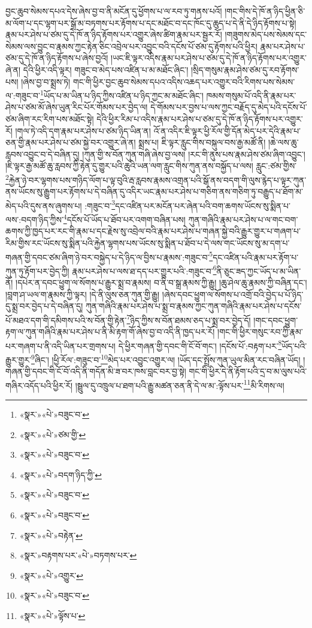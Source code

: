 བྱང་ཆུབ་སེམས་དཔའ་དེས་ཞེས་བྱ་བ་ནི་མངོན་དུ་ཕྱོགས་པ་ལ་རབ་ཏུ་གནས་པའོ། །གང་གིས་དེ་ཁོ་ན་ཉིད་ཕྱིན་ཅི་མ་ལོག་པ་དང་ལྷག་པར་སྒྲོ་མ་བཏགས་པར་རྟོགས་པ་དང་མཐོང་བ་དང་ཁོང་དུ་ཆུད་པ་དེ་ནི་དེ་ཉིད་རྟོགས་པ་སྟེ། རྣམ་པར་ཤེས་པ་ཙམ་དུ་དེ་ཁོ་ན་ཉིད་རྟོགས་པར་འགྱུར་ཞེས་ཚིག་རྣམ་པར་སྦྱར་རོ། །གཟུགས་མེད་པས་སེམས་དང་སེམས་ལས་བྱུང་བ་རྣམས་ཀྱང་རྟེན་ཅིང་འབྲེལ་པར་འབྱུང་བའི་དངོས་པོ་ཙམ་དུ་རྟོགས་པའི་ཕྱིར། རྣམ་པར་ཤེས་པ་ཙམ་དུ་དེ་ཁོ་ན་ཉིད་རྟོགས་པ་ཞེས་བྱའོ། །ཡང་ཇི་ལྟར་འདིས་རྣམ་པར་ཤེས་པ་ཙམ་དུ་དེ་ཁོ་ན་ཉིད་རྟོགས་པར་འགྱུར་ཞེ་ན། དེའི་ཕྱིར་འདི་ལྟར། གཟུང་བ་མེད་པས་འཛིན་པ་མ་མཐོང་ཞིང་། །སྲིད་གསུམ་རྣམ་ཤེས་ཙམ་དུ་རབ་རྟོགས་པས། །ཞེས་བྱ་བ་སྨྲས་ཏེ། གང་གི་ཕྱིར་བྱང་ཆུབ་སེམས་དཔའ་འདིས་འཆད་པར་འགྱུར་བའི་རིགས་པས་སེམས་ལ་:གཟུང་བ་\footnote{«སྣར་»«པེ་»བཟུང་བ་}ཡོད་པ་མ་ཡིན་པ་ཉིད་ཀྱིས་འཛིན་པ་ཉིད་ཀྱང་མ་མཐོང་ཞིང་། ཁམས་གསུམ་པོ་འདི་ནི་རྣམ་པར་ཤེས་པ་ཙམ་མོ་ཞེས་ཡུན་རིང་པོར་གོམས་པར་བྱེད་ལ། དེ་གོམས་པར་བྱས་པ་ལས་ཀྱང་བརྗོད་དུ་མེད་པའི་དངོས་པོ་ཙམ་ཞིག་རང་རིག་པས་མཐོང་སྟེ། དེའི་ཕྱིར་རིམ་པ་འདིས་རྣམ་པར་ཤེས་པ་ཙམ་དུ་དེ་ཁོ་ན་ཉིད་རྟོགས་པར་འགྱུར་རོ། །གལ་ཏེ་འདི་དག་རྣམ་པར་ཤེས་པ་ཙམ་ཉིད་ཡིན་ན། འོ་ན་འདིར་ཇི་ལྟར་ཕྱི་རོལ་གྱི་དོན་མེད་པར་དེའི་རྣམ་པ་ཅན་གྱི་རྣམ་པར་ཤེས་པ་ཙམ་སྐྱེ་བར་འགྱུར་ཞེ་ན། སྨྲས་པ། ཇི་ལྟར་རླུང་གིས་བསྐུལ་བས་རྒྱ་མཚོ་ནི། །ཆེ་ལས་ཆུ་རླབས་འབྱུང་བ་དེ་བཞིན་དུ། །ཀུན་གྱི་ས་བོན་ཀུན་གཞི་ཞེས་བྱ་ལས། །རང་གི་ནུས་པས་རྣམ་ཤེས་ཙམ་ཞིག་འབྱུང་། །ཇི་ལྟར་རྒྱ་མཚོ་ཆུ་རླབས་ཀྱི་རྟེན་དུ་གྱུར་པའི་ཆུའི་ཡན་ལག་རླུང་གིས་ཀུན་ནས་བསྐྱོད་པ་ལས། རླུང་:ཙམ་གྱིས་\footnote{«སྣར་»«པེ་»ཙམ་གྱི་}རྐྱེན་ཉེ་བར་ལྷགས་པས་གཉིད་ལོག་པ་ལྟ་བུའི་རྦ་རླབས་རྣམས་འགྲན་པའི་སྒོ་ནས་བདག་གི་ལུས་རྙེད་པ་ལྟར་ཀུན་ནས་ཡོངས་སུ་རྒྱུག་པར་རྟོགས་པ་དེ་བཞིན་དུ་འདིར་ཡང་རྣམ་པར་ཤེས་པ་གཅིག་ནས་གཅིག་ཏུ་བརྒྱུད་པ་ཐོག་མ་མེད་པའི་དུས་ནས་ཞུགས་པ། :གཟུང་བ་\footnote{«སྣར་»«པེ་»བཟུང་བ་}དང་འཛིན་པར་མངོན་པར་ཞེན་པའི་བག་ཆགས་ཡོངས་སུ་སྨིན་པ་ལས་:བདག་ཉིད་ཀྱིས་\footnote{«སྣར་»«པེ་»བདག་ཉིད་ཀྱི་}དངོས་པོ་ཡོད་པ་ཐོབ་པར་འགག་བཞིན་པས། ཀུན་གཞིའི་རྣམ་པར་ཤེས་པ་ལ་གང་བག་ཆགས་ཀྱི་ཁྱད་པར་རང་གི་རྣམ་པ་དང་རྗེས་སུ་འབྲེལ་བའི་རྣམ་པར་ཤེས་པ་གཞན་སྐྱེ་བའི་རྒྱུར་གྱུར་པ་གཞག་པ་རིམ་གྱིས་རང་ཡོངས་སུ་སྨིན་པའི་རྐྱེན་ལྷགས་པས་ཡོངས་སུ་སྨིན་པ་ཐོབ་པ་དེ་ལས་གང་ཡོངས་སུ་མ་དག་པ་གཞན་གྱི་དབང་ཙམ་ཞིག་ཉེ་བར་བསྐྱེད་པ་དེ་ཉིད་ལ་བྱིས་པ་རྣམས་:གཟུང་བ་\footnote{«སྣར་»«པེ་»བཟུང་བ་}དང་འཛིན་པའི་རྣམ་པར་རྟོག་པ་ཀུན་ཏུ་རྟོག་པར་བྱེད་ཀྱི། རྣམ་པར་ཤེས་པ་ལས་ཐ་དད་པར་གྱུར་པའི་:གཟུང་བ་\footnote{«སྣར་»«པེ་»བཟུང་བ་}ནི་ཅུང་ཟད་ཀྱང་ཡོད་པ་མ་ཡིན་ནོ། །དཔེར་ན་དབང་ཕྱུག་ལ་སོགས་པ་རྒྱུར་སྨྲ་བ་རྣམས། བ་ནི་བ་སྒྲ་རྣམས་ཀྱི་རྒྱུ། །ཆུ་ཤེལ་ཆུ་རྣམས་ཀྱི་བཞིན་དང་། །བླག་ཤ་ཡལ་ག་རྣམས་ཀྱི་ལྟར། །དེ་ནི་ལུས་ཅན་ཀུན་གྱི་རྒྱུ། །ཞེས་དབང་ཕྱུག་ལ་སོགས་པ་འགྲོ་བའི་བྱེད་པ་པོ་ཉིད་དུ་སྨྲ་བར་བྱེད་པ་དེ་བཞིན་དུ། ཀུན་གཞིའི་རྣམ་པར་ཤེས་པ་སྨྲ་བ་རྣམས་ཀྱང་ཀུན་གཞིའི་རྣམ་པར་ཤེས་པ་དངོས་པོ་མཐའ་དག་གི་དམིགས་པའི་ས་བོན་གྱི་རྟེན་\footnote{«སྣར་»«པེ་»བརྟེན་}ཉིད་ཀྱིས་ས་བོན་ཐམས་ཅད་པ་སྨྲ་བར་བྱེད་དོ། །གང་དབང་ཕྱུག་རྟག་ལ་ཀུན་གཞིའི་རྣམ་པར་ཤེས་པ་ནི་མི་རྟག་གོ་ཞེས་བྱ་བ་འདི་ནི་ཁྱད་པར་རོ། །གང་གི་ཕྱིར་གསུང་རབ་ཀྱི་རྣམ་པར་གཞག་པ་ནི་འདི་ཡིན་པར་གྲགས་པ། དེ་ཕྱིར་གཞན་གྱི་དབང་གི་ངོ་བོ་གང་། །དངོས་པོ་:བརྟག་པར་\footnote{«སྣར་»བརྟགས་པར་«པེ་»བཏགས་པར་}ཡོད་པའི་རྒྱུར་གྱུར་\footnote{«སྣར་»«པེ་»འགྱུར་}ཞིང་། །ཕྱི་རོལ་:གཟུང་བ་\footnote{«སྣར་»«པེ་»བཟུང་བ་}མེད་པར་འབྱུང་འགྱུར་ལ། །ཡོད་དང་སྤྲོས་ཀུན་ཡུལ་མིན་རང་བཞིན་ཡོད། །གཞན་གྱི་དབང་གི་ངོ་བོ་འདི་ནི་གདོན་མི་ཟ་བར་ཁས་བླང་བར་བྱ་སྟེ། གང་གི་ཕྱིར་དེ་ནི་རྟོག་པའི་དྲ་བ་མ་ལུས་པའི་གཞིར་འདོད་པའི་ཕྱིར་རོ། །སྦྲུལ་དུ་འཁྲུལ་པ་ཐག་པའི་རྒྱུ་མཚན་ཅན་ནི་དེ་ལ་མ་:ལྟོས་པར་\footnote{«སྣར་»«པེ་»ལྟོས་པ་}མི་རིགས་ལ། 